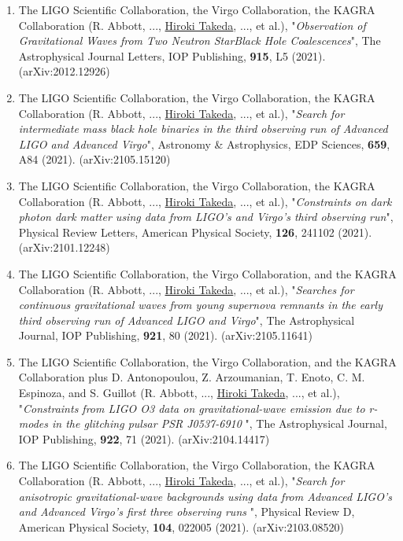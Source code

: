 \documentclass[uplatex, 11pt]{jsarticle}
\begin{document}
\begin{enumerate}
\item The LIGO Scientific Collaboration, the Virgo Collaboration, the KAGRA Collaboration (R. Abbott, ..., \uline{Hiroki Takeda}, ..., et al.), "\emph{Observation of Gravitational Waves from Two Neutron StarBlack Hole Coalescences}", The Astrophysical Journal Letters, IOP Publishing, {\bf 915}, L5 (2021). (arXiv:2012.12926)\\

\item The LIGO Scientific Collaboration, the Virgo Collaboration, the KAGRA Collaboration (R. Abbott, ..., \uline{Hiroki Takeda}, ..., et al.), "\emph{Search for intermediate mass black hole binaries in the third observing run of Advanced LIGO and Advanced Virgo}", Astronomy \& Astrophysics, EDP Sciences, {\bf 659}, A84 (2021). (arXiv:2105.15120)\\

\item The LIGO Scientific Collaboration, the Virgo Collaboration, the KAGRA Collaboration (R. Abbott, ..., \uline{Hiroki Takeda}, ..., et al.), "\emph{Constraints on dark photon dark matter using data from LIGO's and Virgo's third observing run}", Physical Review Letters, American Physical Society, {\bf 126}, 241102 (2021). (arXiv:2101.12248)\\

\item The LIGO Scientific Collaboration, the Virgo Collaboration, and the KAGRA Collaboration (R. Abbott, ..., \uline{Hiroki Takeda}, ..., et al.), "\emph{Searches for continuous gravitational waves from young supernova remnants in the early third observing run of Advanced LIGO and Virgo}", The Astrophysical Journal, IOP Publishing, {\bf 921}, 80 (2021). (arXiv:2105.11641)\\

\item The LIGO Scientific Collaboration, the Virgo Collaboration, and the KAGRA Collaboration plus D. Antonopoulou, Z. Arzoumanian, T. Enoto, C. M. Espinoza, and S. Guillot (R. Abbott, ..., \uline{Hiroki Takeda}, ..., et al.), "\emph{Constraints from LIGO O3 data on gravitational-wave emission due to r-modes in the glitching pulsar PSR J0537-6910 }", The Astrophysical Journal, IOP Publishing, {\bf 922}, 71 (2021). (arXiv:2104.14417)\\

\item The LIGO Scientific Collaboration, the Virgo Collaboration, the KAGRA Collaboration (R. Abbott, ..., \uline{Hiroki Takeda}, ..., et al.), "\emph{Search for anisotropic gravitational-wave backgrounds using data from Advanced LIGO's and Advanced Virgo's first three observing runs }", Physical Review D, American Physical Society, {\bf 104}, 022005 (2021). (arXiv:2103.08520)\\


\end{enumerate}
\end{document}

